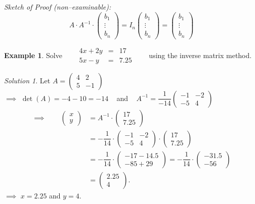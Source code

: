 \documentclass[
  12pt,
  oneside]{book}
\theoremstyle{definition}
\theoremstyle{definition}
\newtheorem{example}{Example}[chapter]
\theoremstyle{definition}
\theoremstyle{definition}
\theoremstyle{remark}
\newtheorem*{solution}{Solution}
\begin{document}
\emph{Sketch of Proof (non--examinable):}
\[
A\cdot A^{-1}\cdot
\begin{pmatrix}b_1\\\vdots\\ b_n\end{pmatrix}
=
I_n
\begin{pmatrix}b_1\\\vdots\\ b_n\end{pmatrix}
=
\begin{pmatrix}b_1\\\vdots\\ b_n\end{pmatrix}
\]

\begin{example}
Solve ~ ~ \(\begin{matrix}4x+2y &=& 17\\ 5x-y &=& 7.25\end{matrix}\) ~ ~ using the inverse matrix method.
\end{example}

\begin{solution}
Let \(A=\begin{pmatrix}4&2\\5&-1 \end{pmatrix}\)\\
\(\implies\) \(\det(A)=-4-10=-14\) ~ and ~ \(A^{-1}=\dfrac{1}{-14}\begin{pmatrix}-1&-2\\-5&4\end{pmatrix}\)
\begin{align*}
\implies\quad\quad
\begin{pmatrix}x\\y\end{pmatrix} &= A^{-1}\cdot \begin{pmatrix}17\\7.25\end{pmatrix}\\
&=-\dfrac{1}{14}\cdot\begin{pmatrix}-1&-2\\-5&4\end{pmatrix}\cdot \begin{pmatrix}17\\7.25\end{pmatrix}\\
&=-\dfrac{1}{14}\cdot\begin{pmatrix}-17-14.5\\-85+ 29\end{pmatrix} = -\dfrac{1}{14}\cdot\begin{pmatrix}-31.5\\-56\end{pmatrix}\\
&=\begin{pmatrix}2.25\\4\end{pmatrix}.
\end{align*}
\(\implies\) \(x=2.25\) and \(y=4\).
\end{solution}
\end{document}
